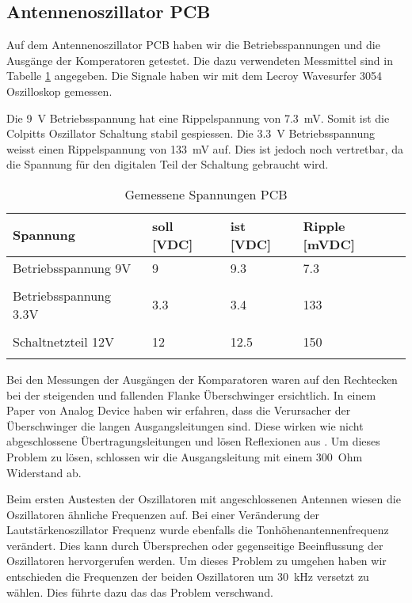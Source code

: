 \subsection{Antennenoszillator PCB}\label{subsec:PCB}
Auf dem Antennenoszillator PCB haben wir die Betriebsspannungen und die Ausgänge der Komperatoren getestet. Die dazu verwendeten Messmittel sind in Tabelle \ref{tab:Gemessene_Spannungen_PCB} angegeben. Die Signale haben wir mit dem Lecroy Wavesurfer 3054 Oszilloskop gemessen. 

Die \SI{9}{V} Betriebsspannung hat eine Rippelspannung von \SI{7.3}{mV}. Somit ist die Colpitts Oszillator Schaltung stabil gespiessen. Die \SI{3.3}{V} Betriebsspannung weisst einen Rippelspannung von \SI{133}{mV} auf. Dies ist jedoch noch vertretbar, da die Spannung für den digitalen Teil der Schaltung gebraucht wird.
\begin{table}[H]
	\centering
	\caption{Gemessene Spannungen PCB}
	\label{tab:Gemessene_Spannungen_PCB}
	\begin{tabular}{l|l|l|l}
		\textbf{Spannung} & \textbf{soll [VDC]} & \textbf{ist [VDC]} &	\textbf{Ripple [mVDC]}\\
		\hline \hline
		
		Betriebsspannung 9V & 9 & 9.3 &  7.3 \\ 
		&      &   &   \\ 
		\hline
		Betriebsspannung 3.3V & 3.3 & 3.4 &  133 \\ 
		&     &     &   \\ 
		\hline
		Schaltnetzteil 12V & 12 & 12.5 &  150 \\ 
		&     &       &   \\ 
		\hline
		
	\end{tabular}
\end{table} 

Bei den Messungen der Ausgängen der Komparatoren waren auf den Rechtecken bei der steigenden und fallenden Flanke Überschwinger ersichtlich. In einem Paper von Analog Device haben wir erfahren, dass die Verursacher der Überschwinger die langen Ausgangsleitungen sind. Diese wirken wie nicht abgeschlossene Übertragungsleitungen und lösen Reflexionen aus \cite{comparator_techniques}. Um dieses Problem zu lösen, schlossen wir die Ausgangsleitung mit einem \SI{300}{Ohm} Widerstand ab.

Beim ersten Austesten der Oszillatoren mit angeschlossenen Antennen wiesen die Oszillatoren ähnliche Frequenzen auf. Bei einer Veränderung der Lautstärkenoszillator Frequenz wurde ebenfalls die Tonhöhenantennenfrequenz verändert. Dies kann durch Übersprechen oder gegenseitige Beeinflussung der Oszillatoren hervorgerufen werden. Um dieses Problem zu umgehen haben wir entschieden die Frequenzen der beiden Oszillatoren um \SI{30}{kHz} versetzt zu wählen. Dies führte dazu das das Problem verschwand.

